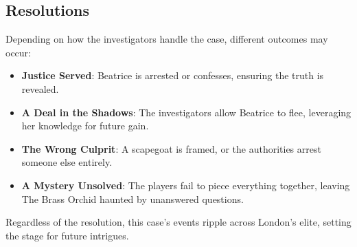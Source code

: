 




\subsection{Resolutions} 
Depending on how the investigators handle the case, different outcomes may occur:
\begin{itemize}
	\item \textbf{Justice Served}: Beatrice is arrested or confesses, ensuring the truth is revealed.
	\item \textbf{A Deal in the Shadows}: The investigators allow Beatrice to flee, leveraging her knowledge for future gain.
	\item \textbf{The Wrong Culprit}: A scapegoat is framed, or the authorities arrest someone else entirely.
	\item \textbf{A Mystery Unsolved}: The players fail to piece everything together, leaving The Brass Orchid haunted by unanswered questions.
\end{itemize}

Regardless of the resolution, this case's events ripple across London’s elite, setting the stage for future intrigues.
